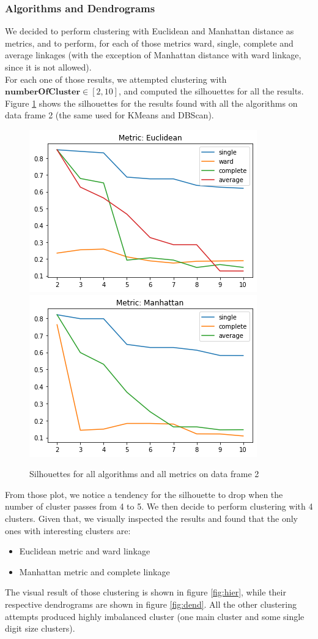 \documentclass{article}
\begin{document}
	\subsubsection{Algorithms and Dendrograms}
	\label{sec:hier}
	We decided to perform clustering with Euclidean and Manhattan distance as metrics, and to perform, for each of those metrics ward, single, complete and average linkages (with the exception of Manhattan distance with ward linkage, since it is not allowed).\\
	For each one of those results, we attempted clustering with $\mathbf{numberOfCluster} \in [2, 10]$, and computed the silhouettes for all the results.
	Figure \ref{fig:silu} shows the silhouettes for the results found with all the algorithms on data frame 2 (the same used for KMeans and DBScan).
	\begin{figure}[]
		\centering
		\includegraphics[width=.35\textwidth]{silueuc}\hspace{1cm}
		\includegraphics[width=.35\textwidth]{siluman.png}
		\caption{Silhouettes for all algorithms and all metrics on data frame 2}
		\label{fig:silu}
	\end{figure}
	From those plot, we notice a tendency for the silhouette to drop when the number of cluster passes from 4 to 5. We then decide to perform clustering with 4 clusters.
	Given that, we visually inspected the results and found that the only ones with interesting clusters are:
	\begin{itemize}
		\item Euclidean metric and ward linkage
		\item Manhattan metric and complete linkage
	\end{itemize}
	The visual result of those clustering is shown in figure \ref{fig:hier}, while their respective dendrograms are shown in figure \ref{fig:dend}. All the other clustering attempts produced highly imbalanced cluster (one main cluster and some single digit size clusters).
\end{document}
